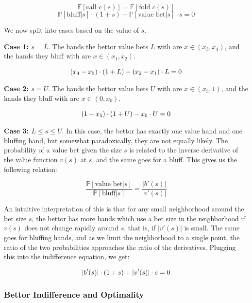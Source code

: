 \documentclass[a4paper,12pt]{article}
\theoremstyle{plain}
\theoremstyle{definition}
\begin{document}
  \[  \mathbb{E}[\text{call } c(s)] = \mathbb{E}[\text{fold } c(s)] \]
  \[  \mathbb{P}[\text{bluff} | s] \cdot (1+s) - \mathbb{P}[\text{value bet} | s]\cdot s = 0 \]


We now split into cases based on the value of $s$.

\textbf{Case 1: $s = L$}. The hands the bettor value bets $L$ with are $x \in (x_3, x_4)$, and the hands they bluff with are $x \in (x_1, x_2)$. 

\begin{equation}{\label{callindiffmin}}
    (x_4-x_3) \cdot (1+L) - (x_2-x_1) \cdot L = 0
\end{equation}

\textbf{Case 2: $s = U$}. The hands the bettor value bets $U$ with are $x \in (x_5, 1)$, and the hands they bluff with are $x \in (0, x_0)$. 

\begin{equation}{\label{callindiffmax}}
    (1-x_5) \cdot (1+U) - x_0 \cdot U = 0
\end{equation}

\textbf{Case 3: $L \leq s \leq U$}. In this case, the bettor has exactly one value hand and one bluffing hand, but somewhat paradoxically, they are not equally likely. The probability of a value bet given the size $s$ is related to the inverse derivative of the value function $v(s)$ at $s$, and the same goes for a bluff. This gives us the following relation:

\[ \frac{\mathbb{P}[\text{value bet} | s]}{\mathbb{P}[\text{bluff} | s]} = \frac{|b'(s)|}{|v'(s)|}\]

An intuitive interpretation of this is that for any small neighborhood around the bet size $s$, the bettor has more hands which use a bet size in the neighborhood if $v(s)$ does not change rapidly around $s$, that is, if $|v'(s)|$ is small. The same goes for bluffing hands, and as we limit the neighborhood to a single point, the ratio of the two probabilities approaches the ratio of the derivatives. Plugging this into the indifference equation, we get:

\begin{equation}{\label{callindiff}}
    |b'(s)| \cdot (1 + s) + |v'(s)| \cdot s = 0
\end{equation}

\subsubsection{Bettor Indifference and Optimality}
\end{document}
